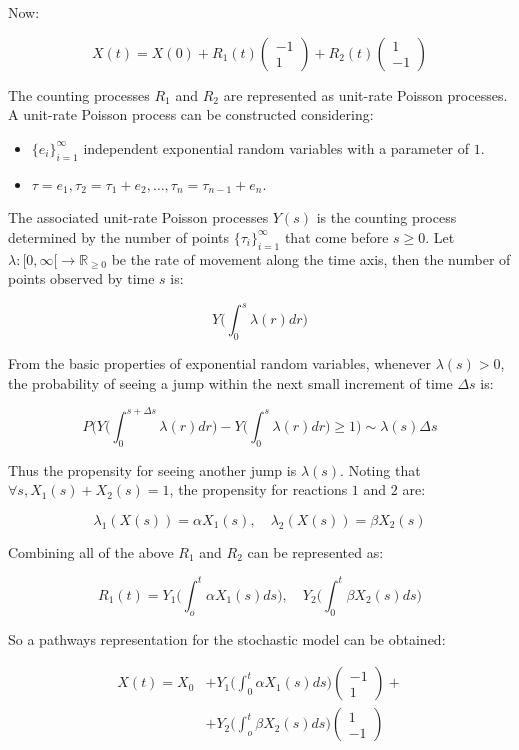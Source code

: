 	Now:

	$$X(t) = X(0) + R_1(t)\begin{pmatrix}-1\\1\end{pmatrix} + R_2(t)\begin{pmatrix}1\\-1\end{pmatrix}$$

	The counting processes $R_1$ and $R_2$ are represented as unit-rate Poisson processes.
	A unit-rate Poisson process can be constructed considering:

	\begin{itemize}
		\item $\{e_i\}_{i=1}^{\infty}$ independent exponential random variables with a parameter of $1$.
		\item $\tau=e_1, \tau_2 = \tau_1+e_2, \dots, \tau_n = \tau_{n-1} + e_n$.
	\end{itemize}

	The associated unit-rate Poisson processes $Y(s)$ is the counting process determined by the number of points $\{\tau_i\}_{i=1}^{\infty}$ that come before $s \ge 0$.
	Let $\lambda:[0, \infty[\rightarrow\mathbb{R}_{\ge 0}$ be the rate of movement along the time axis, then the number of points observed by time $s$ is:

	$$Y\biggl(\int_0^{s}\lambda(r)dr\biggr)$$

	From the basic properties of exponential random variables, whenever $\lambda(s)>0$, the probability of seeing a jump within the next small increment of time $\Delta s$ is:

	$$P\biggl(Y\biggl(\int_{0}^{s+\Delta s}\lambda(r)dr\biggr)-Y\biggl(\int_{0}^{s}\lambda(r)dr\biggr)\ge 1\biggr)\sim \lambda(s)\Delta s$$

	Thus the propensity for seeing another jump is $\lambda(s)$.
	Noting that $\forall s, X_1(s) + X_2(s)=1$, the propensity for reactions $1$ and $2$ are:

	$$\lambda_1(X(s))=\alpha X_1(s), \quad\lambda_2(X(s)) = \beta X_2(s)$$

	Combining all of the above $R_1$ and $R_2$ can be represented as:

	$$R_1(t) = Y_1\biggl(\int_o^t\alpha X_1(s)ds\biggr), \quad Y_2\biggl(\int_0^t\beta X_2(s)ds\biggr)$$

	So a pathways representation for the stochastic model can be obtained:

	\begin{align*}
		X(t) = X_0 &+ Y_1\biggl(\int_0^t \alpha X_1(s)ds\biggr)\begin{pmatrix}-1\\1\end{pmatrix} +\\
							 &+ Y_2\biggl(\int_o^t\beta X_2(s)ds\biggr)\begin{pmatrix}1\\-1\end{pmatrix}
	\end{align*}

